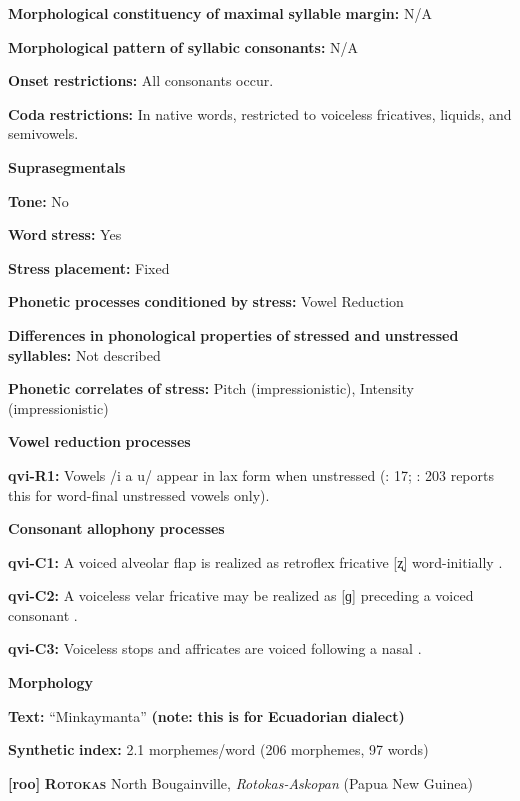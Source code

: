 \begin{styleBody}
\textbf{Morphological} \textbf{constituency} \textbf{of} \textbf{maximal} \textbf{syllable} \textbf{margin:} N/A

\textbf{Morphological} \textbf{pattern} \textbf{of} \textbf{syllabic} \textbf{consonants:} N/A

\textbf{Onset} \textbf{restrictions:} All consonants occur.

\textbf{Coda} \textbf{restrictions:} In native words, restricted to voiceless fricatives, liquids, and semivowels.

\textbf{Suprasegmentals}

\textbf{Tone:} No

\textbf{Word} \textbf{stress:} Yes

\textbf{Stress} \textbf{placement:} Fixed

\textbf{Phonetic} \textbf{processes} \textbf{conditioned} \textbf{by} \textbf{stress:} Vowel Reduction

\textbf{Differences} \textbf{in} \textbf{phonological} \textbf{properties} \textbf{of} \textbf{stressed} \textbf{and} \textbf{unstressed} \textbf{syllables:} Not described

\textbf{Phonetic} \textbf{correlates} \textbf{of} \textbf{stress:} Pitch (impressionistic), Intensity (impressionistic)

\textbf{Vowel} \textbf{reduction} \textbf{processes}

\textbf{qvi-R1:} Vowels /i a u/ appear in lax form when unstressed (\citealt{Jake1983}: 17; \citealt{Cole1982}: 203 reports this for word-final unstressed vowels only).

\textbf{Consonant} \textbf{allophony} \textbf{processes}

\textbf{qvi-C1:} A voiced alveolar flap is realized as retroflex fricative [ʐ] word-initially \citep[202]{Cole1982}.

\textbf{qvi-C2:} A voiceless velar fricative may be realized as [ɡ] preceding a voiced consonant \citep[201]{Cole1982}.

\textbf{qvi-C3:} Voiceless stops and affricates are voiced following a nasal \citep[200]{Cole1982}.

\textbf{Morphology}

\textbf{Text:} “Minkaymanta” \citep[442-55]{Carpenter1982} \textbf{(note:} \textbf{this} \textbf{is} \textbf{for} \textbf{Ecuadorian} \textbf{dialect)}

\textbf{Synthetic} \textbf{index:} 2.1 morphemes/word (206 morphemes, 97 words)

\textbf{[roo]}   \textbf{\textsc{Rotokas}}  North Bougainville, \textit{Rotokas-Askopan} (Papua New Guinea)


\end{styleBody}
